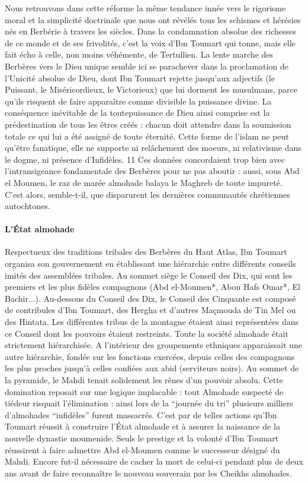 Nous retrouvons dans cette réforme la même tendance innée vers le rigorisme moral et la
simplicité doctrinale que nous ont révélés tous les schismes et hérésies nés en Berbérie à travers
les siècles.
Dans la condamnation absolue des richesses de ce monde et de ses frivolités, c’est la voix
d’Ibn Toumart qui tonne, mais elle fait écho à celle, non moins véhémente, de Tertullien. La
lente marche des Berbères vers le Dieu unique semble ici se parachever dans la proclamation
de l’Unicité absolue de Dieu, dont Ibn Toumart rejette jusqu’aux adjectifs (le Puissant,
le Miséricordieux, le Victorieux) que lui dorment les musulmans, parce qu’ils risquent de
faire apparaître comme divisible la puissance divine. La conséquence inévitable de la toutepuissance
de Dieu ainsi comprise est la prédestination de tous les êtres créés : chacun doit
attendre dans la soumission totale ce qui lui a été assigné de toute éternité.
Cette forme de l’islam ne peut qu’être fanatique, elle ne supporte ni relâchement des moeurs,
ni relativisme dans le dogme, ni présence d’Infidèles.
11 Ces données concordaient trop bien avec l’intransigeance fondamentale des Berbères pour ne
pas aboutir : aussi, sous Abd el Moumen, le raz de marée almohade balaya le Maghreb de
toute impureté. C’est alors, semble-t-il, que disparurent les dernières communautés chrétiennes
autochtones.
\paragraph{L’État almohade}
Respectueux des traditions tribales des Berbères du Haut Atlas, Ibn Toumart organisa son
gouvernement en établissant une hiérarchie entre différents conseils imités des assemblées
tribales. Au sommet siège le Conseil des Dix, qui sont les premiers et les plus fidèles
compagnons (Abd el-Moumen*, Abou Hafs Omar*, El Bachir...). Au-dessous du Conseil
des Dix, le Conseil des Cinquante est composé de contribules d’Ibn Toumart, des Hergha et
d’autres Maçmouda de Tin Mel ou des Hintata. Les différentes tribus de la montagne étaient
ainsi représentées dans ce Conseil dont les pouvoirs étaient restreints.
Toute la société almohade était strictement hiérarchisée. A l’intérieur des groupements
ethniques apparaissait une autre hiérarchie, fondée sur les fonctions exercées, depuis celles
des compagnons les plus proches jusqu’à celles confiées aux abid (serviteurs noirs). Au
sommet de la pyramide, le Mahdi tenait solidement les rênes d’un pouvoir absolu. Cette
domination reposait sur une logique implacable : tout Almohade suspecté de tiédeur risquait
l’élimination : ainsi lors de la “journée du tri” plusieurs milliers d’almohades “infidèles” furent
massacrés. C’est par de telles actions qu’Ibn Toumart réussit à construire l’État almohade et à
assurer la naissance de la nouvelle dynastie moumenide. Seuls le prestige et la volonté d’Ibn
Toumart réussirent à faire admettre Abd el-Moumen comme le successeur désigné du Mahdi.
Encore fut-il nécessaire de cacher la mort de celui-ci pendant plus de deux ans avant de faire
reconnaître le nouveau souverain par les Cheikhs almohades.
